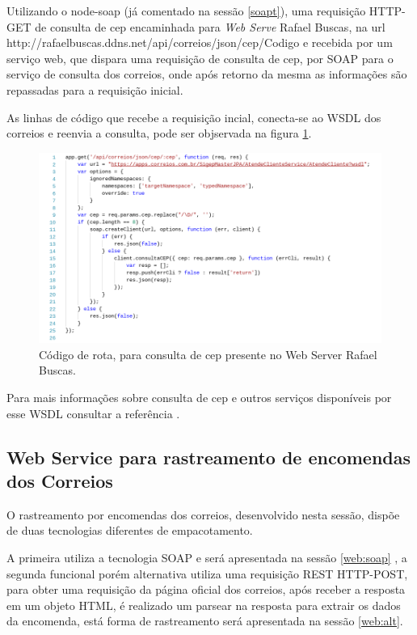 \documentclass[journal]{IEEEtran}
\begin{document}
Utilizando o node-soap (já comentado na sessão \ref{soapt}), uma requisição HTTP-GET de consulta de cep encaminhada para \textit{Web Serve} Rafael Buscas, na url http://rafaelbuscas.ddns.net/api/correios/json/cep/Codigo e recebida por um serviço web, que dispara uma requisição de consulta de cep, por SOAP para o serviço de consulta dos correios, onde após retorno da mesma as informações são repassadas para a requisição inicial.

As linhas de código que recebe a requisição incial, conecta-se ao WSDL dos correios e reenvia a consulta, pode ser objservada na figura \ref{c22}. 

\begin{figure}[H]
	\centering
	\includegraphics[scale=0.48]{Imagens/codigocep.png}
	\caption{Código de rota, para consulta de cep presente no Web Server Rafael Buscas.}
	\label{c22}
\end{figure}

Para mais informações sobre consulta de cep e outros serviços disponíveis por esse WSDL consultar a referência \cite{correiosapp}.

\subsection{Web Service para rastreamento de encomendas dos Correios}
O rastreamento por encomendas dos correios, desenvolvido nesta sessão, dispõe de duas tecnologias diferentes de empacotamento.

A primeira utiliza a tecnologia SOAP e será apresentada na sessão \ref{web:soap} , a segunda funcional porém alternativa utiliza uma requisição REST HTTP-POST, para obter uma requisição da página oficial dos correios, após receber a resposta em um objeto HTML, é realizado um parsear na resposta para extrair os dados da encomenda, está forma de rastreamento será apresentada na sessão \ref{web:alt}.
\end{document}
